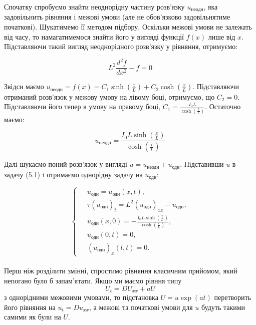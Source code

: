 Спочатку спробуємо знайти неоднорідну частину розв'язку $u_{\text{неодн}}$, яка задовільнить рівняння і межові умови (але не обов'язково задовільнятиме початкові). Шукатимемо її методом підбору. Оскільки межові умови не залежать від часу, то намагатимемося знайти його у вигляді функції $f(x)$ лише від $x$. Підставляючи такий вигляд неоднорідного розв'язку у рівняння, отримуємо:

\begin{equation*}
L^2\frac{d^2f}{dx^2} - f = 0
\end{equation*}

Звідси маємо $u_{\text{неодн}}=f(x)=C_1\sinh{(\frac{x}{L})}+C_2\cosh{(\frac{x}{L})}$. Підставляючи отриманий розв'язок у межову умову на лівому боці, отримуємо, що $C_2=0$. Підставляючи його тепер в умову на правому боці,  $C_1=\frac{I_0L}{\cosh{(\frac{l}{L})}}$. Остаточно маємо:

\begin{equation}
u_{\text{неодн}}=\frac{I_0L\sinh{(\frac{x}{L})}}{\cosh{(\frac{l}{L})}}
\end{equation}

Далі шукаємо поний розв'язок у вигляді $u=u_{\text{неодн}}+u_{\text{одн}}$. Підставивши $u$ в задачу (5.1) i отримаємо однорідну задачу на $u_{\text{одн}}$:


\begin{equation*} 
    \left\{ \begin{aligned} %
            \;&u_{\text{одн}} = u_{\text{одн}}(x,t), \\
            &\tau (u_{\text{одн}})_t=L^2(u_{\text{одн}})_{xx}-u_{\text{одн}}, \\
            &u_{\text{одн}}(x,0)=-\frac{I_0L\sinh{(\frac{x}{L})}}{\cosh{(\frac{l}{L})}},\\
            &u_{\text{одн}}(0,t) = 0, \\
            &(u_{\text{одн}})_x(l,t) = 0. 
    \end{aligned} \right.
\end{equation*}
\\

Перш ніж розділити змінні, спростимо рівняння класичним прийомом, який непогано було б запам'ятати. Якщо ми маємо рівння типу 
\begin{equation}
U_t=DU_{xx}+aU    
\end{equation}
з однорідними межовими умовами, то підстановка $U = u\exp{(at)}$ перетворить його рівняння на $u_t=Du_{xx}$, а межові та початкові умови для $u$ будуть такими самими як були на $U$.\\\\

